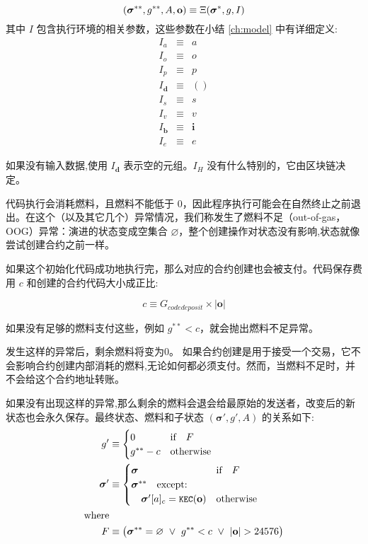 \documentclass[9pt,oneside]{amsart}
\begin{document}
\begin{multicols}{2}
\begin{equation}
(\boldsymbol{\sigma}^{**}, g^{**}, A, \mathbf{o}) \equiv \Xi(\boldsymbol{\sigma}^*, g, I) \\
\end{equation}
其中 $I$ 包含执行环境的相关参数，这些参数在小结 \ref{ch:model} 中有详细定义:
\begin{eqnarray}
I_a & \equiv & a \\
I_o & \equiv & o \\
I_p & \equiv & p \\
I_\mathbf{d} & \equiv & () \\
I_s & \equiv & s \\
I_v & \equiv & v \\
I_\mathbf{b} & \equiv & \mathbf{i} \\
I_e & \equiv & e
\end{eqnarray}

如果没有输入数据,使用 $I_\mathbf{d}$ 表示空的元组。$I_H$ 没有什么特别的，它由区块链决定。


代码执行会消耗燃料，且燃料不能低于 0，因此程序执行可能会在自然终止之前退出。在这个（以及其它几个）异常情况，我们称发生了燃料不足（out-of-gas，OOG）异常：演进的状态变成空集合 $\varnothing$，整个创建操作对状态没有影响,状态就像尝试创建合约之前一样。

如果这个初始化代码成功地执行完，那么对应的合约创建也会被支付。代码保存费用 $c$ 和创建的合约代码大小成正比:

\begin{equation}
c \equiv G_{codedeposit} \times |\mathbf{o}|
\end{equation}

如果没有足够的燃料支付这些，例如 $g^{**} < c$，就会抛出燃料不足异常。


发生这样的异常后，剩余燃料将变为0。 如果合约创建是用于接受一个交易，它不会影响合约创建内部消耗的燃料,无论如何都必须支付。然而，当燃料不足时，并不会给这个合约地址转账。

如果没有出现这样的异常,那么剩余的燃料会退会给最原始的发送者，改变后的新状态也会永久保存。最终状态、燃料和子状态 $(\boldsymbol{\sigma}', g', A)$ 的关系如下:
\begin{align}
\quad g' &\equiv \begin{cases}
0 & \text{if} \quad F \\
g^{**} - c & \text{otherwise} \\
\end{cases} \\
\quad \boldsymbol{\sigma}' &\equiv  \begin{cases}
\boldsymbol{\sigma} & \text{if} \quad F \\
\boldsymbol{\sigma}^{**} \quad \text{except:} & \\
\quad\boldsymbol{\sigma}'[a]_c = \texttt{\small KEC}(\mathbf{o}) & \text{otherwise}
\end{cases} \\
\nonumber \text{where} \\
F &\equiv \big(\boldsymbol{\sigma}^{**} = \varnothing \ \vee\  g^{**} < c \ \vee\  |\mathbf{o}| > 24576\big)
\end{align}


\end{multicols}
\end{document}
